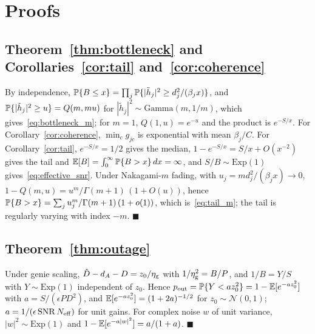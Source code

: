 \section{Proofs}
\label{app:proofs}

\subsection{Theorem~\ref{thm:bottleneck} and Corollaries~\ref{cor:tail} and~\ref{cor:coherence}}
By independence, $\mathbb{P}\{B\le x\}=\prod_j\mathbb{P}\{|\tilde h_j|^2\ge d_j^2/(\beta_jx)\}$, and $\mathbb{P}\{|\tilde h_j|^2\ge u\}=Q(m,mu)$ for $|\tilde h_j|^2\sim\mathrm{Gamma}(m,1/m)$, which gives~\eqref{eq:bottleneck_m}; for $m=1$, $Q(1,u)=e^{-u}$ and the product is $e^{-S/x}$. For Corollary~\ref{cor:coherence}, $\min_cg_{jc}$ is exponential with mean $\beta_j/C$. For Corollary~\ref{cor:tail}, $e^{-S/x}=1/2$ gives the median, $1-e^{-S/x}=S/x+O(x^{-2})$ gives the tail and $\mathbb{E}[B]=\int_0^\infty\mathbb{P}\{B>x\}\,dx=\infty$, and $S/B\sim\mathrm{Exp}(1)$ gives~\eqref{eq:effective_snr}. Under Nakagami-$m$ fading, with $u_j=md_j^2/(\beta_jx)\to0$, $1-Q(m,u)=u^m/\Gamma(m+1)\,(1+O(u))$, hence $\mathbb{P}\{B>x\}=\sum_ju_j^m/\Gamma(m+1)\,(1+o(1))$, which is~\eqref{eq:tail_m}; the tail is regularly varying with index $-m$. \hfill$\blacksquare$

\subsection{Theorem~\ref{thm:outage}}
Under genie scaling, $\hat D-d_A-D=z_0/\eta_{\rm g}$ with $1/\eta_{\rm g}^2=B/P$, and $1/B=Y/S$ with $Y\sim\mathrm{Exp}(1)$ independent of $z_0$. Hence $p_{\rm out}=\mathbb{P}\{Y<az_0^2\}=1-\mathbb{E}[e^{-az_0^2}]$ with $a=S/(\epsilon PD^2)$, and $\mathbb{E}[e^{-az_0^2}]=(1+2a)^{-1/2}$ for $z_0\sim\mathcal{N}(0,1)$; $a=1/(\epsilon\,\mathrm{SNR}\,N_{\mathrm{eff}})$ for unit gains. For complex noise $w$ of unit variance, $|w|^2\sim\mathrm{Exp}(1)$ and $1-\mathbb{E}[e^{-a|w|^2}]=a/(1+a)$. \hfill$\blacksquare$

